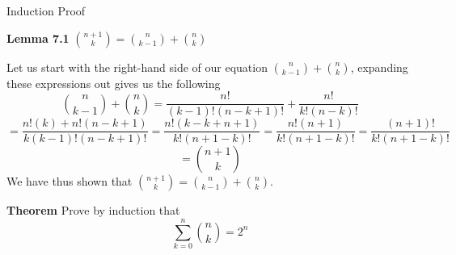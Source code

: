 Induction Proof



\textbf{Lemma 7.1} ${n +1 \choose k} = {n \choose k - 1} + {n \choose k}$

Let us start with the right-hand side of our equation ${n \choose k - 1} + {n \choose k}$, expanding these expressions out gives us the following 
$$ {n \choose k - 1} + {n \choose k} = \frac{n!}{(k-1)!(n-k+1)!} + \frac{n!}{k!(n-k)!}$$
$$ = \frac{n!(k) + n!(n-k+1)}{k(k-1)!(n-k+1)!} = \frac{n!(k -k + n + 1)}{k! (n+1 - k)!} = \frac{n!(n+1)}{k! (n+1 - k)!} = \frac{(n+1)!}{k! (n+1 - k)!}$$
$$ = {n+1 \choose k}$$
We have thus shown that ${n +1 \choose k} = {n \choose k - 1} + {n \choose k}$.

\textbf{Theorem}
Prove by induction that \[ \sum_{k=0}^{n} {n \choose k}= 2^n \]

